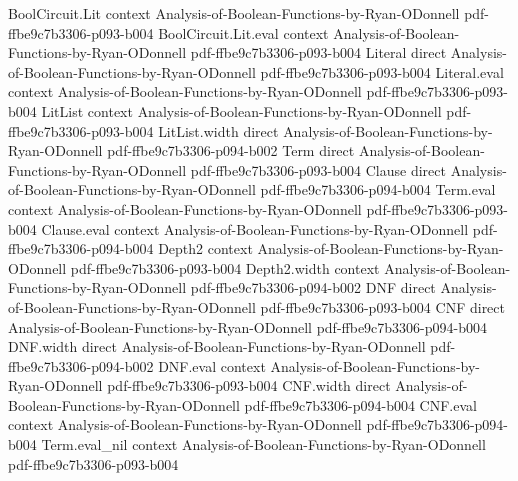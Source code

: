 \begin{lemma}
\leanok
{}
\proofstep
  {BoolCircuit.Lit}
  {context}
  {Analysis-of-Boolean-Functions-by-Ryan-ODonnell}
  {pdf-ffbe9c7b3306-p093-b004}
\proofstep
  {BoolCircuit.Lit.eval}
  {context}
  {Analysis-of-Boolean-Functions-by-Ryan-ODonnell}
  {pdf-ffbe9c7b3306-p093-b004}
\proofstep
  {Literal}
  {direct}
  {Analysis-of-Boolean-Functions-by-Ryan-ODonnell}
  {pdf-ffbe9c7b3306-p093-b004}
\proofstep
  {Literal.eval}
  {context}
  {Analysis-of-Boolean-Functions-by-Ryan-ODonnell}
  {pdf-ffbe9c7b3306-p093-b004}
\proofstep
  {LitList}
  {context}
  {Analysis-of-Boolean-Functions-by-Ryan-ODonnell}
  {pdf-ffbe9c7b3306-p093-b004}
\proofstep
  {LitList.width}
  {direct}
  {Analysis-of-Boolean-Functions-by-Ryan-ODonnell}
  {pdf-ffbe9c7b3306-p094-b002}
\proofstep
  {Term}
  {direct}
  {Analysis-of-Boolean-Functions-by-Ryan-ODonnell}
  {pdf-ffbe9c7b3306-p093-b004}
\proofstep
  {Clause}
  {direct}
  {Analysis-of-Boolean-Functions-by-Ryan-ODonnell}
  {pdf-ffbe9c7b3306-p094-b004}
\proofstep
  {Term.eval}
  {context}
  {Analysis-of-Boolean-Functions-by-Ryan-ODonnell}
  {pdf-ffbe9c7b3306-p093-b004}
\proofstep
  {Clause.eval}
  {context}
  {Analysis-of-Boolean-Functions-by-Ryan-ODonnell}
  {pdf-ffbe9c7b3306-p094-b004}
\proofstep
  {Depth2}
  {context}
  {Analysis-of-Boolean-Functions-by-Ryan-ODonnell}
  {pdf-ffbe9c7b3306-p093-b004}
\proofstep
  {Depth2.width}
  {context}
  {Analysis-of-Boolean-Functions-by-Ryan-ODonnell}
  {pdf-ffbe9c7b3306-p094-b002}
\proofstep
  {DNF}
  {direct}
  {Analysis-of-Boolean-Functions-by-Ryan-ODonnell}
  {pdf-ffbe9c7b3306-p093-b004}
\proofstep
  {CNF}
  {direct}
  {Analysis-of-Boolean-Functions-by-Ryan-ODonnell}
  {pdf-ffbe9c7b3306-p094-b004}
\proofstep
  {DNF.width}
  {direct}
  {Analysis-of-Boolean-Functions-by-Ryan-ODonnell}
  {pdf-ffbe9c7b3306-p094-b002}
\proofstep
  {DNF.eval}
  {context}
  {Analysis-of-Boolean-Functions-by-Ryan-ODonnell}
  {pdf-ffbe9c7b3306-p093-b004}
\proofstep
  {CNF.width}
  {direct}
  {Analysis-of-Boolean-Functions-by-Ryan-ODonnell}
  {pdf-ffbe9c7b3306-p094-b004}
\proofstep
  {CNF.eval}
  {context}
  {Analysis-of-Boolean-Functions-by-Ryan-ODonnell}
  {pdf-ffbe9c7b3306-p094-b004}
\proofstep
  {Term.eval_nil}
  {context}
  {Analysis-of-Boolean-Functions-by-Ryan-ODonnell}
  {pdf-ffbe9c7b3306-p093-b004}

\end{lemma}
